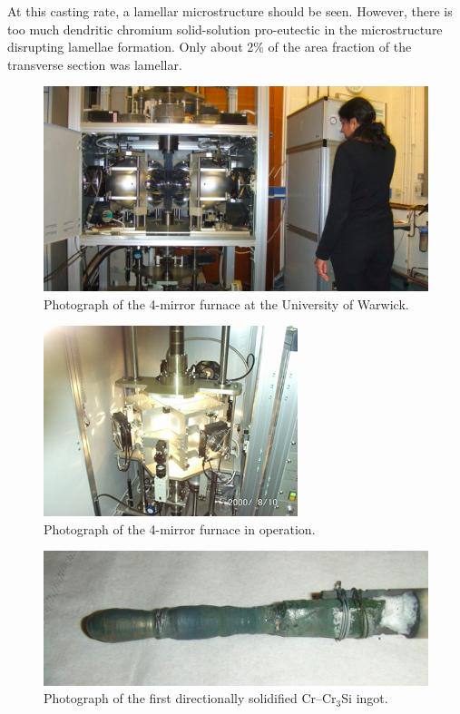 At this casting rate, a lamellar microstructure should be seen.  However, there is too much dendritic chromium solid-solution pro-eutectic in the microstructure disrupting lamellae formation.  Only about 2\% of the area fraction of the transverse section was lamellar. 
%
\begin{figure}[H]
\begin{center}
\includegraphics{MirrorFurnace}
\caption{Photograph of the 4-mirror furnace at the University of Warwick.}
\label{fig:MirrorFurnace}
\end{center}
\end{figure}
%
%
\begin{figure}[H]
\begin{center}
\includegraphics{mirroron}
\caption{Photograph of the 4-mirror furnace in operation.}
\label{fig:MirrorFurnace}
\end{center}
\end{figure}
%

%
\begin{figure}[H]
\begin{center}
\includegraphics{FirstCast}
\caption{Photograph of the first directionally solidified Cr--Cr$_3$Si ingot.}\label{fig:FirstCast}
\end{center}
\end{figure}
%



